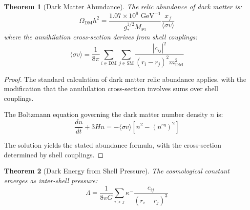 \documentclass[12pt,a4paper]{article}
\newtheorem{theorem}{Theorem}[section]
\begin{document}
\begin{theorem}[Dark Matter Abundance]
\label{thm:dark-matter}
The relic abundance of dark matter is:
\begin{equation}
\Omega_{\text{DM}} h^2 = \frac{1.07 \times 10^9 \text{ GeV}^{-1}}{g_*^{1/2} M_{\text{Pl}}} \frac{x_f}{\langle\sigma v\rangle}
\end{equation}
where the annihilation cross-section derives from shell couplings:
\begin{equation}
\langle\sigma v\rangle = \frac{1}{8\pi} \sum_{i \in \text{DM}} \sum_{j \in \text{SM}} \frac{|c_{ij}|^2}{(r_i - r_j)^2 m_{\text{DM}}^2}
\end{equation}
\end{theorem}

\begin{proof}
The standard calculation of dark matter relic abundance applies, with the modification that the annihilation cross-section involves sums over shell couplings.

The Boltzmann equation governing the dark matter number density $n$ is:
\begin{equation}
\frac{dn}{dt} + 3Hn = -\langle\sigma v\rangle [n^2 - (n^{eq})^2]
\end{equation}

The solution yields the stated abundance formula, with the cross-section determined by shell couplings.
\end{proof}

\begin{theorem}[Dark Energy from Shell Pressure]
\label{thm:dark-energy}
The cosmological constant emerges as inter-shell pressure:
\begin{equation}
\Lambda = \frac{1}{8\pi G} \sum_{i>j} \kappa^- \frac{c_{ij}}{(r_i - r_j)^3}
\end{equation}
\end{theorem}
\end{document}
